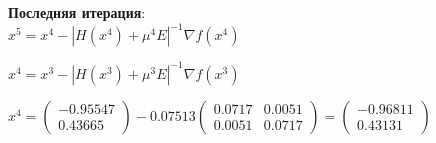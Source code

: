 \textbf{Последняя итерация}:\\
$x^{5} = x^{4} - |H(x^{4}) + \mu^{4}E|^{-1} \nabla f(x^{4})$

$x^{4} = x^{3} - |H(x^{3}) + \mu^{3}E|^{-1} \nabla f(x^{3})$

$
x^{4} = 
\begin{pmatrix}
  -0.95547\\
  0.43665
\end{pmatrix}
- 0.07513
\begin{pmatrix}
  0.0717 & 0.0051\\
  0.0051 & 0.0717
\end{pmatrix}
=
\begin{pmatrix}
  -0.96811\\
  0.43131
\end{pmatrix}
$

\pagebreak
